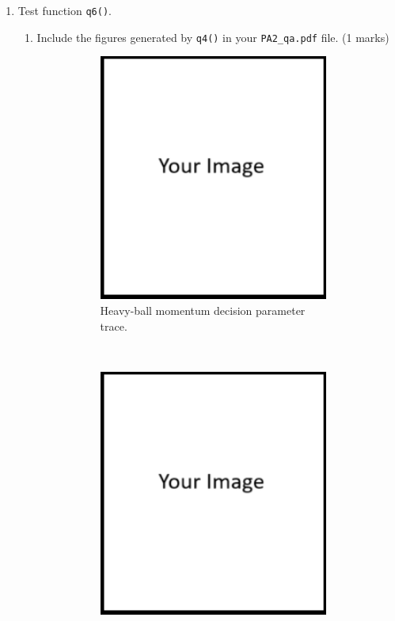 \documentclass{article}
\theoremstyle{definition}
\newtheorem*{answer}{Answer}
\begin{document}
\begin{enumerate}[label=\ref{mom}.\alph*]
\begin{enumerate}[label=1.2.a.\roman*]
\begin{figure}[h]
\begin{subfigure}[t]{0.5\textwidth}
					\caption{Heavy-ball momentum Loss vs. iteration.}
				\end{subfigure}
				\caption{Figures generated by q5().}
			\end{figure}
		\item In 1-2 sentences, compare the performance of SGD with and without heavy-ball momentum by comparing the outcome of tests \verb|q3()| and \verb|q5()| (2 marks)
		\begin{answer}
			Your answer ...
		\end{answer}
	\end{enumerate}
	\newpage
	\item Test function \verb|q6()|.
	\begin{enumerate}[label=1.2.b.\roman*]
		\item Include the figures generated by \verb|q4()| in your \verb|PA2_qa.pdf| file. (1 marks)
		\begin{figure}[h]
			\centering
			\begin{subfigure}[t]{0.5\textwidth}
				\centering
				\includegraphics[height=3.2in]{image.png}
				\caption{Heavy-ball momentum decision parameter trace.}
			\end{subfigure}%
			~ 
			\begin{subfigure}[t]{0.5\textwidth}
				\centering
				\includegraphics[height=3.2in]{image.png}

\end{subfigure}
\end{figure}
\end{enumerate}
\end{enumerate}
\end{document}
